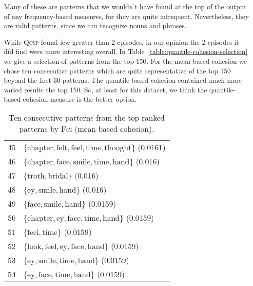 Many of these are patterns that we wouldn't have found at the top of the output of any frequency-based measures, for they are quite infrequent. Nevertheless, they are valid patterns, since we can recognize nouns and phrases.

While \textsc{Qcsp} found few greater-than-2-episodes, in our opinion the 2-episodes it did find were more interesting overall. In Table~\ref{table:quantile-cohesion-selection} we give a selection of patterns from the top 150. For the mean-based cohesion we chose ten consecutive patterns which are quite representative of the top 150 beyond the first 30 patterns. The quantile-based cohesion contained much more varied results the top 150. So, at least for this dataset, we think the quantile-based cohesion measure is the better option.

\begin{table}
\centering
\begin{tabulary}{\textwidth}{R|L}
45 & $ \{ \text{chapter},\allowbreak \text{felt},\allowbreak \text{feel},\allowbreak \text{time},\allowbreak \text{thought} \} $ (0.0161) \\
46 & $ \{ \text{chapter},\allowbreak \text{face},\allowbreak \text{smile},\allowbreak \text{time},\allowbreak \text{hand} \} $ (0.016) \\
47 & $ \{ \text{troth},\allowbreak \text{bridal} \} $ (0.016) \\
48 & $ \{ \text{ey},\allowbreak \text{smile},\allowbreak \text{hand} \} $ (0.016) \\
49 & $ \{ \text{face},\allowbreak \text{smile},\allowbreak \text{hand} \} $ (0.0159) \\
50 & $ \{ \text{chapter},\allowbreak \text{ey},\allowbreak \text{face},\allowbreak \text{time},\allowbreak \text{hand} \} $ (0.0159) \\
51 & $ \{ \text{feel},\allowbreak \text{time} \} $ (0.0159) \\
52 & $ \{ \text{look},\allowbreak \text{feel},\allowbreak \text{ey},\allowbreak \text{face},\allowbreak \text{hand} \} $ (0.0159) \\
53 & $ \{ \text{ey},\allowbreak \text{smile},\allowbreak \text{time},\allowbreak \text{hand} \} $ (0.0159) \\
54 & $ \{ \text{ey},\allowbreak \text{face},\allowbreak \text{time},\allowbreak \text{hand} \} $ (0.0159) \\
\end{tabulary}
\caption{Ten consecutive patterns from the top-ranked patterns by \textsc{Fci} (mean-based cohesion).}
\label{table:mean-cohesion-selection}
\end{table}

